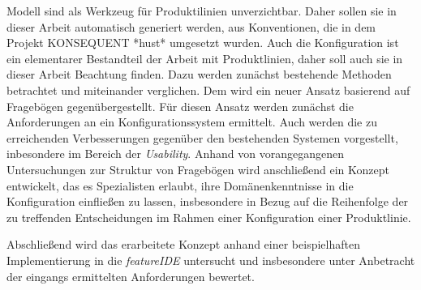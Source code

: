 % 
% 
% 
% 
 Modell sind als Werkzeug f\"ur Produktilinien unverzichtbar. Daher sollen sie in dieser Arbeit automatisch generiert werden, aus Konventionen, die in dem Projekt KONSEQUENT *hust* umgesetzt wurden.
Auch die Konfiguration ist ein elementarer Bestandteil der Arbeit mit Produktlinien, daher soll auch sie in dieser Arbeit Beachtung finden. Dazu werden zun\"achst bestehende Methoden betrachtet und miteinander verglichen. Dem wird ein neuer Ansatz basierend auf Frageb\"ogen gegen\"ubergestellt. F\"ur diesen Ansatz werden zun\"achst die Anforderungen an ein Konfigurationssystem ermittelt. Auch werden die zu erreichenden Verbesserungen gegen\"uber den bestehenden Systemen vorgestellt, inbesondere im Bereich der \textit{Usability}. Anhand von vorangegangenen Untersuchungen zur Struktur von Frageb\"ogen wird anschlie\ss end ein Konzept entwickelt, das es Spezialisten erlaubt, ihre Dom\"anenkenntnisse in die Konfiguration einflie\ss en zu lassen, insbesondere in Bezug auf die Reihenfolge der zu treffenden Entscheidungen im Rahmen einer Konfiguration einer Produktlinie.

Abschlie\ss end wird das erarbeitete Konzept anhand einer beispielhaften Implementierung in die \textit{featureIDE} untersucht und insbesondere unter Anbetracht der eingangs ermittelten Anforderungen bewertet.